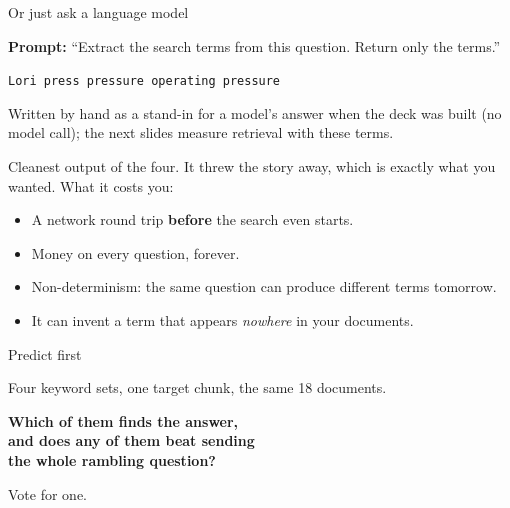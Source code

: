 \documentclass[aspectratio=169]{beamer}
\begin{document}
\begin{frame}{Or just ask a language model}
  \vspace{0.4em}
  \begin{center}
  \begin{tcolorbox}[colback=lightbg, colframe=gray, boxrule=0.5pt, arc=2pt, width=0.9\textwidth]
    \small
    \textbf{Prompt:} ``Extract the search terms from this question. Return only the terms.''
  \end{tcolorbox}
  \end{center}

  \vspace{0.3em}
  \begin{center}
  \begin{tcolorbox}[colback=armblue!8, colframe=armblue, boxrule=0.6pt, arc=2pt, width=0.9\textwidth]
    \small \texttt{Lori press \quad pressure \quad operating pressure}
  \end{tcolorbox}
  \end{center}
  {\footnotesize\color{gray}Written by hand as a stand-in for a model's answer when the deck was built (no model call);
  the next slides measure retrieval with these terms.}

  \vspace{0.6em}
  Cleanest output of the four. It threw the story away, which is exactly what you wanted.
  What it costs you:

  \vspace{0.4em}
  \begin{itemize}
    \item {\small A network round trip \textbf{before} the search even starts.}
    \item {\small Money on every question, forever.}
    \item {\small Non-determinism: the same question can produce different terms tomorrow.}
    \item {\small It can invent a term that appears \emph{nowhere} in your documents.}
  \end{itemize}
\end{frame}

\begin{frame}{Predict first}
  \vspace{1.2em}
  \begin{center}
    {\large Four keyword sets, one target chunk, the same 18 documents.}
  \end{center}

  \vspace{1.4em}
  \begin{center}
    {\Large\color{popblue}\textbf{Which of them finds the answer,}}\\[0.4em]
    {\Large\color{popblue}\textbf{and does any of them beat sending}}\\[0.4em]
    {\Large\color{popblue}\textbf{the whole rambling question?}}
  \end{center}

  \vspace{1.4em}
  \begin{center}
  {\small\color{gray}Vote for one.}
  \end{center}
\end{frame}
\end{document}
